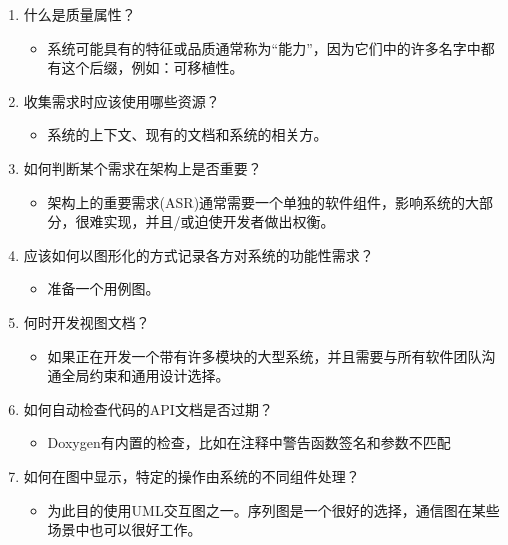 \begin{enumerate}
\item
什么是质量属性？

\begin{itemize}
\item 
系统可能具有的特征或品质通常称为“能力”，因为它们中的许多名字中都有这个后缀，例如：可移植性。
\end{itemize}

\item
收集需求时应该使用哪些资源？

\begin{itemize}
\item 
系统的上下文、现有的文档和系统的相关方。
\end{itemize}

\item
如何判断某个需求在架构上是否重要？

\begin{itemize}
\item 
架构上的重要需求(ASR)通常需要一个单独的软件组件，影响系统的大部分，很难实现，并且/或迫使开发者做出权衡。
\end{itemize}

\item
应该如何以图形化的方式记录各方对系统的功能性需求？

\begin{itemize}
\item 
准备一个用例图。
\end{itemize}

\item
何时开发视图文档？

\begin{itemize}
\item 
如果正在开发一个带有许多模块的大型系统，并且需要与所有软件团队沟通全局约束和通用设计选择。
\end{itemize}

\item
如何自动检查代码的API文档是否过期？

\begin{itemize}
\item 
Doxygen有内置的检查，比如在注释中警告函数签名和参数不匹配
\end{itemize}

\item
如何在图中显示，特定的操作由系统的不同组件处理？

\begin{itemize}
\item 
为此目的使用UML交互图之一。序列图是一个很好的选择，通信图在某些场景中也可以很好工作。
\end{itemize}

\end{enumerate}
